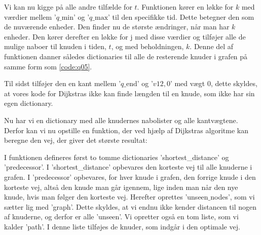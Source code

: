 Vi kan nu kigge på alle andre tilfælde for $t$. Funktionen kører en løkke for $k$ med værdier mellem '$q\textrm{\_min}$' og '$q\textrm{\_max}$' til den specifikke tid. Dette betegner den som de nuværende enheder.
Den finder nu de største ændringer, når man har $k$ enheder. Den kører derefter en løkke for $\textrm{j}$ med disse værdier og tilføjer alle de mulige naboer til knuden i tiden, $t$, og med beholdningen, $k$. Denne del af funktionen danner således dictionaries til alle de resterende knuder i grafen på samme form som \autoref{code:q05}.

Til sidst tilføjer den en kant mellem '$q\textrm{\_end}$' og '$v12,0$' med vægt $0$, dette skyldes, at vores kode for Dijkstras ikke kan finde længden til en knude, som ikke har sin egen dictionary.

Nu har vi en dictionary med alle knudernes nabolister og alle kantvægtene. Derfor kan vi nu opstille en funktion, der ved hjælp af Dijkstras algoritme kan beregne den vej, der giver det største resultat:



I funktionen defineres først to tomme dictionaries 'shortest\_distance' og 'predecessor'. I 'shortest\_distance' opbevares den korteste vej til alle knuderne i grafen. I 'predecessor' opbevares, for hver knude i grafen, den forrige knude i den korteste vej, altså den knude man går igennem, lige inden man når den nye knude, hvis man følger den korteste vej. Herefter oprettes 'unseen$\_$nodes', som vi sætter lig med 'graph'. Dette skyldes, at vi endnu ikke kender distancen til nogen af knuderne, og derfor er alle 'unseen'. Vi opretter også en tom liste, som vi kalder 'path'. I denne liste tilføjes de knuder, som indgår i den optimale vej.

